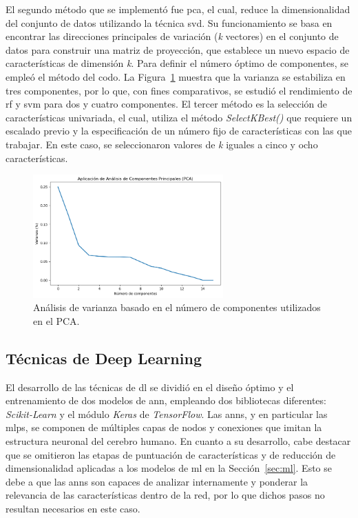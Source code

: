 El segundo método que se implementó fue \gls{pca}, el cual, reduce la dimensionalidad del conjunto de datos utilizando la técnica \gls{svd}. Su funcionamiento se basa en encontrar las direcciones principales de variación (\textit{k} vectores) en el conjunto de datos para construir una matriz de proyección, que establece un nuevo espacio de características de dimensión \textit{k}. Para definir el número óptimo de componentes, se empleó el método del codo. La Figura~\ref{fig:fault_sg_13} muestra que la varianza se estabiliza en tres componentes, por lo que, con fines comparativos, se estudió el rendimiento de \gls{rf} y \gls{svm} para dos y cuatro componentes.  El tercer método es la selección de características univariada, el cual, utiliza el método \textit{SelectKBest()} que requiere un escalado previo y la especificación de un número fijo de características con las que trabajar. En este caso, se seleccionaron valores de \textit{k} iguales a cinco y ocho características.  
    

\begin{figure}[H]
\centering
\includegraphics[width=0.65\textwidth]{fig/06_fault_sg/fault_sg_13.png}
\caption{Análisis de varianza basado en el número de componentes utilizados en el PCA.}
\label{fig:fault_sg_13}
\end{figure}

\subsection{Técnicas de Deep Learning}
\label{sec:dl}

El desarrollo de las técnicas de \gls{dl} se dividió en el diseño óptimo y el entrenamiento de dos modelos de \gls{ann}, empleando dos bibliotecas diferentes: \textit{Scikit-Learn} y el módulo \textit{Keras} de \textit{TensorFlow}. Las \glspl{ann}, y en particular las \glspl{mlp}, se componen de múltiples capas de nodos y conexiones que imitan la estructura neuronal del cerebro humano. En cuanto a su desarrollo, cabe destacar que se omitieron las etapas de puntuación de características y de reducción de dimensionalidad aplicadas a los modelos de \gls{ml} en la Sección~\ref{sec:ml}. Esto se debe a que las \glspl{ann} son capaces de analizar internamente y ponderar la relevancia de las características dentro de la red, por lo que dichos pasos no resultan necesarios en este caso.  

